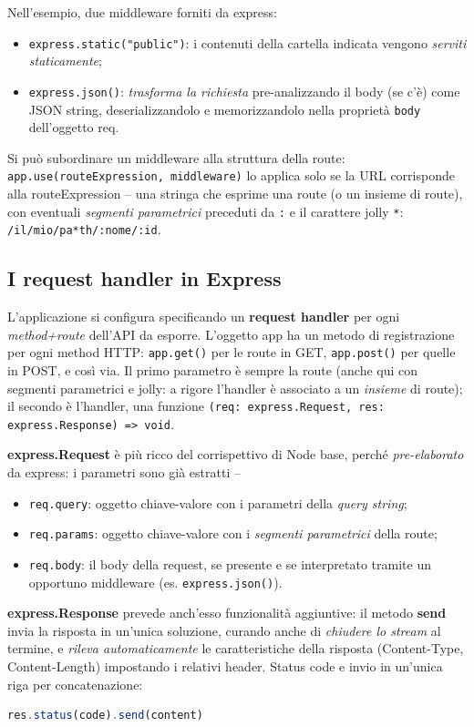 Nell'esempio, due middleware forniti da express:
\begin{itemize}
  \item \texttt{express.static("public")}: i contenuti della cartella indicata vengono
        \emph{serviti staticamente};
  \item \texttt{express.json()}: \emph{trasforma la richiesta} pre-analizzando il body (se
        c'\`e) come JSON string, deserializzandolo e memorizzandolo nella propriet\`a
        \texttt{body} dell'oggetto req.
\end{itemize}
Si pu\`o subordinare un middleware alla struttura della route:
\texttt{app.use(routeExpression, middleware)} lo applica solo se la URL corrisponde alla
routeExpression -- una stringa che esprime una route (o un insieme di route), con eventuali
\emph{segmenti parametrici} preceduti da \texttt{:} e il carattere jolly \texttt{*}:
\texttt{/il/mio/pa*th/:nome/:id}.

\subsection{I request handler in Express}
L'applicazione si configura specificando un \textbf{request handler} per ogni
\emph{method+route} dell'API da esporre. L'oggetto app ha un metodo di registrazione per ogni
method HTTP: \texttt{app.get()} per le route in GET, \texttt{app.post()} per quelle in POST,
e cos\`i via. Il primo parametro \`e sempre la route (anche qui con segmenti parametrici e
jolly: a rigore l'handler \`e associato a un \emph{insieme} di route); il secondo \`e
l'handler, una funzione
\texttt{(req: express.Request, res: express.Response) => void}.

\textbf{express.Request} \`e pi\`u ricco del corrispettivo di Node base, perch\'e
\emph{pre-elaborato} da express: i parametri sono gi\`a estratti --
\begin{itemize}
  \item \texttt{req.query}: oggetto chiave-valore con i parametri della \emph{query string};
  \item \texttt{req.params}: oggetto chiave-valore con i \emph{segmenti parametrici} della
        route;
  \item \texttt{req.body}: il body della request, se presente e se interpretato tramite un
        opportuno middleware (es. \texttt{express.json()}).
\end{itemize}

\textbf{express.Response} prevede anch'esso funzionalit\`a aggiuntive: il metodo
\textbf{send} invia la risposta in un'unica soluzione, curando anche di \emph{chiudere lo
stream} al termine, e \emph{rileva automaticamente} le caratteristiche della risposta
(Content-Type, Content-Length) impostando i relativi header. Status code e invio in un'unica
riga per concatenazione:
\begin{lstlisting}[language=JavaScript]
res.status(code).send(content)
\end{lstlisting}
